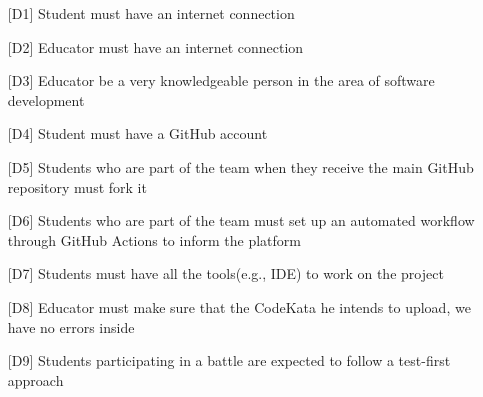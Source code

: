 \begin{itemize}[left=20pt]
    \setlength{\itemsep}{0pt}
    \setlength{\parskip}{0pt}
    \setlength{\parsep}{0pt}
    \setlength{\partopsep}{0pt}
    \setlength{\topsep}{0pt}
    \item [{[D1]}] Student  must have an internet connection
    \item [{[D2]}] Educator must have an internet connection
    \item [{[D3]}] Educator be a very knowledgeable person in the area of software development
    \item [{[D4]}] Student must have a GitHub account
    \item [{[D5]}] Students who are part of the team when they receive the main GitHub repository must fork it
    \item [{[D6]}] Students who are part of the team must set up an automated workflow through GitHub Actions to inform the platform
    \item [{[D7]}] Students must have all the tools(e.g., IDE) to work on the project
    \item [{[D8]}] Educator must make sure that the CodeKata he intends to upload, we have no errors inside
    \item [{[D9]}] Students participating in a battle are expected to follow a test-first approach
    
\end{itemize}
